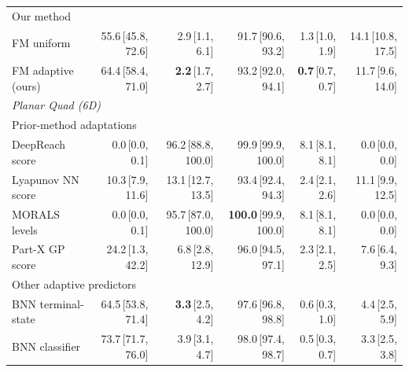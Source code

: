 \begin{tabular}{lrrrrr}
\multicolumn{6}{l}{\footnotesize\color{black!55} Our method} \\
FM uniform & 55.6\,{\scriptsize\color{black!55}[45.8, 72.6]} & 2.9\,{\scriptsize\color{black!55}[1.1, 6.1]} & 91.7\,{\scriptsize\color{black!55}[90.6, 93.2]} & 1.3\,{\scriptsize\color{black!55}[1.0, 1.9]} & 14.1\,{\scriptsize\color{black!55}[10.8, 17.5]} \\
FM adaptive (ours) & 64.4\,{\scriptsize\color{black!55}[58.4, 71.0]} & \textbf{2.2}\,{\scriptsize\color{black!55}[1.7, 2.7]} & 93.2\,{\scriptsize\color{black!55}[92.0, 94.1]} & \textbf{0.7}\,{\scriptsize\color{black!55}[0.7, 0.7]} & 11.7\,{\scriptsize\color{black!55}[9.6, 14.0]} \\
\midrule
\multicolumn{6}{l}{\textit{Planar Quad (6D)}} \\
\multicolumn{6}{l}{\footnotesize\color{black!55} Prior-method adaptations} \\
DeepReach score & 0.0\,{\scriptsize\color{black!55}[0.0, 0.1]} & 96.2\,{\scriptsize\color{black!55}[88.8, 100.0]} & 99.9\,{\scriptsize\color{black!55}[99.9, 100.0]} & 8.1\,{\scriptsize\color{black!55}[8.1, 8.1]} & 0.0\,{\scriptsize\color{black!55}[0.0, 0.0]} \\
Lyapunov NN score & 10.3\,{\scriptsize\color{black!55}[7.9, 11.6]} & 13.1\,{\scriptsize\color{black!55}[12.7, 13.5]} & 93.4\,{\scriptsize\color{black!55}[92.4, 94.3]} & 2.4\,{\scriptsize\color{black!55}[2.1, 2.6]} & 11.1\,{\scriptsize\color{black!55}[9.9, 12.5]} \\
MORALS levels & 0.0\,{\scriptsize\color{black!55}[0.0, 0.1]} & 95.7\,{\scriptsize\color{black!55}[87.0, 100.0]} & \textbf{100.0}\,{\scriptsize\color{black!55}[99.9, 100.0]} & 8.1\,{\scriptsize\color{black!55}[8.1, 8.1]} & 0.0\,{\scriptsize\color{black!55}[0.0, 0.0]} \\
Part-X GP score & 24.2\,{\scriptsize\color{black!55}[1.3, 42.2]} & 6.8\,{\scriptsize\color{black!55}[2.8, 12.9]} & 96.0\,{\scriptsize\color{black!55}[94.5, 97.1]} & 2.3\,{\scriptsize\color{black!55}[2.1, 2.5]} & 7.6\,{\scriptsize\color{black!55}[6.4, 9.3]} \\
\multicolumn{6}{l}{\footnotesize\color{black!55} Other adaptive predictors} \\
BNN terminal-state & 64.5\,{\scriptsize\color{black!55}[53.8, 71.4]} & \textbf{3.3}\,{\scriptsize\color{black!55}[2.5, 4.2]} & 97.6\,{\scriptsize\color{black!55}[96.8, 98.8]} & 0.6\,{\scriptsize\color{black!55}[0.3, 1.0]} & 4.4\,{\scriptsize\color{black!55}[2.5, 5.9]} \\
BNN classifier & 73.7\,{\scriptsize\color{black!55}[71.7, 76.0]} & 3.9\,{\scriptsize\color{black!55}[3.1, 4.7]} & 98.0\,{\scriptsize\color{black!55}[97.4, 98.7]} & 0.5\,{\scriptsize\color{black!55}[0.3, 0.7]} & 3.3\,{\scriptsize\color{black!55}[2.5, 3.8]} \\

\end{tabular}
